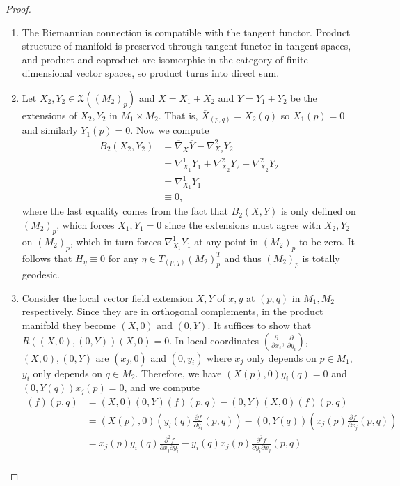 \documentclass[12pt]{article}
\begin{document}
\begin{proof}
\begin{enumerate}[label=(\alph*)]
	\item The Riemannian connection is compatible with the tangent functor. Product structure of manifold is preserved through tangent functor in tangent spaces, and product and coproduct are isomorphic in the category of finite dimensional vector spaces, so product turns into direct sum.
	\item Let $ X_2,Y_2 \in \mathfrak{X}((M_2)_p)$ and $ \overline{X} = X_1 + X_2$ and $ \overline{Y} = Y_1 + Y_2$ be the extensions of $ X_2,Y_2$ in $ M_1 \times M_2$. That is, $ \overline{X}_{(p,q)} = X_2(q)$ so $ X_1(p) =0$ and similarly $ Y_1(p)=0$. Now we compute
		\begin{align*}
			B_2(X_2,Y_2) &= \overline{\nabla}_{\overline{X}}\overline{Y} - \nabla_{X_2}^2 Y_2 \\
			&= \nabla_{X_1}^{1} Y_1 + \nabla_{X_2}^2 Y_2 - \nabla_{X_2}^2 Y_2 \\
			&= \nabla_{X_1}^{1}Y_1 \\
			&\equiv 0 ,
		\end{align*}
		where the last equality comes from the fact that $ B_2(X,Y)$ is only defined on  $ (M_2)_p$, which forces $ X_1, Y_1 =0$ since the extensions must agree with $ X_2,Y_2$ on $ (M_2)_p$, which in turn forces $ \nabla_{X_1}^{1} Y_1$ at any point in $ (M_2)_p$ to be zero. It follows that $ H_{ \eta} \equiv 0$ for any $ \eta \in T_{(p,q)} (M_2)_p ^{T}$ and thus $ (M_2)_p$ is totally geodesic.
	\item Consider the local vector field extension $ X,Y$ of $ x,y$ at  $ (p,q)$ in $ M_1,M_2$ respectively. Since they are in orthogonal complements, in the product manifold they become $ (X,0)$ and  $ (0,Y)$. It suffices to show that $ R((X,0),(0,Y))(X,0) = 0$. In local coordinates $ \left( \frac{\partial }{\partial x_j}, \frac{\partial }{\partial y_i}   \right) $, $ (X,0),(0,Y)$ are $ (x_j,0)$ and  $ (0,y_i)$ where $ x_j$ only depends on $ p \in M_1$, $y_i$ only depends on $ q \in M_2$. Therefore, we have $ (X(p),0)y_i(q) = 0$ and $ (0,Y(q))x_j(p) = 0$, and we compute
\begin{align*}
	[(X,0),(0,Y)](f)(p,q) &= (X,0)(0,Y)(f)(p,q) - (0,Y)(X,0)(f)(p,q) \\
	&= (X(p),0) \left( y_i(q) \frac{\partial f}{\partial y_i}(p,q)  \right) - (0,Y(q)) \left( x_j(p) \frac{\partial f}{\partial x_j}(p,q)  \right)   \\
	&= x_j(p) y_i(q) \frac{\partial^2 f}{\partial x_j \partial y_i } - y_i(q) x_j(p) \frac{\partial^2 f}{\partial y_i \partial x_j}(p,q)   \\

\end{align*}
\end{enumerate}
\end{proof}
\end{document}
